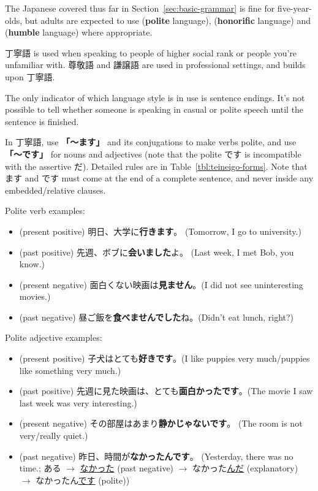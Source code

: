 \documentclass[../nihongo-gakushuu-kyouzai.tex]{subfiles}
\begin{document}
The Japanese covered thus far in Section~\ref{sec:basic-grammar} is fine for five-year-olds, but adults are expected to use  (\textbf{polite} language),  (\textbf{honorific} language) and  (\textbf{humble} language) where appropriate.

丁寧語 is used when speaking to people of higher social rank or people you're unfamiliar with. 尊敬語 and 謙譲語 are used in professional settings, and builds upon 丁寧語.

The only indicator of which language style is in use is sentence endings. It's not possible to tell whether someone is speaking in casual or polite speech until the sentence is finished.

In 丁寧語, use \textbf{「〜ます」} and its conjugations to make verbs polite, and use \textbf{「〜です」} for nouns and adjectives (note that the polite です is incompatible with the assertive だ). Detailed rules are in Table~\ref{tbl:teineigo-forms}. Note that ます and です must come at the end of a complete sentence, and never inside any embedded/relative clauses.

Polite verb examples:
\begin{itemize}
    \item (present positive) 明日、大学に\textbf{行きます}。 (Tomorrow, I go to university.)
    \item (past positive) 先週、ボブに\textbf{会いました}よ。 (Last week, I met Bob, you know.)
    \item (present negative) 面白くない映画は\textbf{見ません}。(I did not see uninteresting movies.)
    \item (past negative) 昼ご飯を\textbf{食べませんでした}ね。(Didn't eat lunch, right?)
\end{itemize}

Polite adjective examples:
\begin{itemize}
    \item (present positive) 子犬はとても\textbf{好きです}。(I like puppies very much/puppies like something very much.)
    \item (past positive) 先週に見た映画は、とても\textbf{面白かったです}。(The movie I saw last week was very interesting.)
    \item (present negative) その部屋はあまり\textbf{静かじゃないです}。 (The room is not very/really quiet.)
    \item (past negative) 昨日、時間が\textbf{なかったんです}。 (Yesterday, there was no time.; ある $\to$ \ul{なかった} (past negative) $\to$ なかった\ul{んだ} (explanatory) $\to$ なかったん\ul{です} (polite))
\end{itemize}
\end{document}
